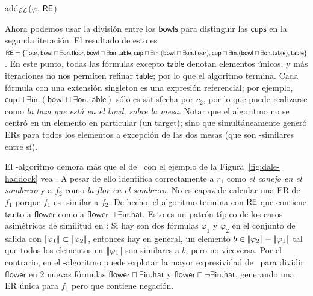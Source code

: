 %
\begin{algorithm}[t]
\dontprintsemicolon
\caption{add$_\mathcal{EL}$($\varphi$, $\textsf{RE}$)}
\label{algo:bisim-add-el}
\end{algorithm}
Ahora podemos usar la divisi\'on entre los $\mathsf{bowls}$ para distinguir las $\mathsf{cups}$ en
la segunda iteraci\'on. El resultado de esto es $\textsf{RE} = \{ \mathsf{floor},
\mathsf{bowl} \sqcap \exists \mathsf{on}.\mathsf{floor}, \mathsf{bowl}
\sqcap \exists \mathsf{on}.\mathsf{table}, \mathsf{cup} \sqcap \exists
\mathsf{in}. (\mathsf{bowl} \sqcap \exists
\mathsf{on}.\mathsf{floor}), \mathsf{cup} \sqcap \exists
\mathsf{in}. (\mathsf{bowl} \sqcap \exists
\mathsf{on}.\mathsf{table}), \mathsf{table} \}$. En este punto, todas las
f\'ormulas excepto $ \mathsf{table} $ denotan elementos \'unicos, y m\'as
iteraciones no nos permiten refinar $ \mathsf {table} $; por lo que el algoritmo
termina. Cada f\'ormula con una extensi\'on singleton es una expresi\'on referencial; por ejemplo, $\mathsf{cup} \sqcap \exists
\mathsf{in}. (\mathsf{bowl} \sqcap \exists \mathsf{on}.\mathsf{table})$ s\'olo es satisfecha por $ c_2 $, por lo que puede
realizarse como \textit{la taza que est\'a en el bowl, sobre la mesa}. Notar que
el algoritmo no se centr\'o en un elemento en particular (un target); sino que 
simult\'aneamente gener\'o ERs para todos los elementos a excepci\'on de las dos
mesas (que son \EL-similares entre s\'i).


El \el-algoritmo demora m\'as que el de \alc\ con el ejemplo de la Figura~\ref{fig:dale-haddock} vea \cite{Stone1998a}. A pesar de ello
identifica correctamente a $r_1$ como \textit{el conejo en el sombrero} y a $ f_2$ como
\textit{la flor en el sombrero}. No es capaz de calcular una ER de $f_1$
porque $f_1$ es \el-similar a $f_2$. De hecho, el algoritmo
termina con $ \textsf{RE} $ que contiene tanto a $\mathsf{flower}$ como a
$\mathsf{flower} \sqcap \exists \mathsf{in}.\mathsf{hat}$. Esto es un
patr\'on t\'ipico de los casos asim\'etricos de similitud en \EL: Si hay
son dos f\'ormulas $ \varphi_1 $ y $ \varphi_2$ en el conjunto de salida con
$|\!|\varphi_1|\!| \subset |\!|\varphi_2|\!|$, entonces hay
en general, un elemento $b \in |\!|\varphi_2|\!| -
|\!|\varphi_1|\!|$ tal que todos los elementos en $|\!|\varphi_1|\!| $ 
son similares a $ b $, pero no viceversa. Por el contrario, en el \alc-algoritmo puede explotar la mayor expresividad de \alc\ para dividir
$\mathsf{flower}$ en 2 nuevas f\'ormulas $\mathsf{flower} \sqcap
\exists \mathsf{in}.\mathsf{hat}$ y $\mathsf{flower} \sqcap \neg
\exists \mathsf{in}.\mathsf{hat}$, generando una ER \'unica para $f_1  $ pero que contiene negaci\'on.

